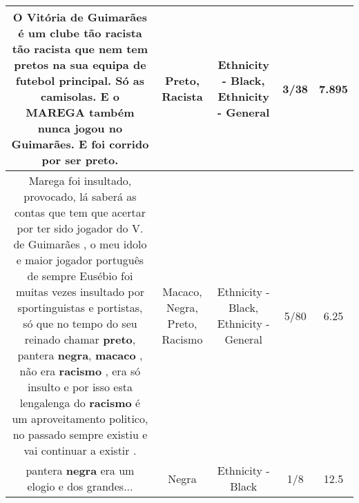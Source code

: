 \documentclass[11pt]{article}
\newlength\mylength
\begin{document}
\begin{center}
\begin{longtable}{|C{.65\mylength}|C{.30\mylength}|C{.12\mylength}|C{.12\mylength}|C{.12\mylength}|}
  \small O Vitória de Guimarães é um clube tão \textbf{racista} tão \textbf{racista} que nem tem pretos na sua equipa de futebol principal. Só as camisolas. E o MAREGA também nunca jogou no Guimarães. E foi corrido por ser \textbf{preto}.\normalsize   & Preto, Racista & Ethnicity - Black, Ethnicity - General & 3/38 & 7.895 \\  \hline
  \small Marega foi insultado, provocado, lá saberá as contas que tem que acertar por ter sido jogador do V. de Guimarães , o meu idolo e maior jogador português de sempre Eusébio foi muitas vezes insultado por sportinguistas e portistas, só que no tempo do seu reinado chamar \textbf{preto}, pantera \textbf{negra}, \textbf{macaco} , não era \textbf{racismo} , era só insulto e por isso esta lengalenga do \textbf{racismo} é um aproveitamento politico, no passado sempre existiu e vai continuar a existir .\normalsize   & Macaco, Negra, Preto, Racismo & Ethnicity - Black, Ethnicity - General & 5/80 & 6.25 \\  \hline
  \small pantera \textbf{negra} era um elogio e dos grandes...\normalsize   & Negra & Ethnicity - Black & 1/8 & 12.5 \\  \hline
  
\end{longtable}
\end{center}
\end{document}
